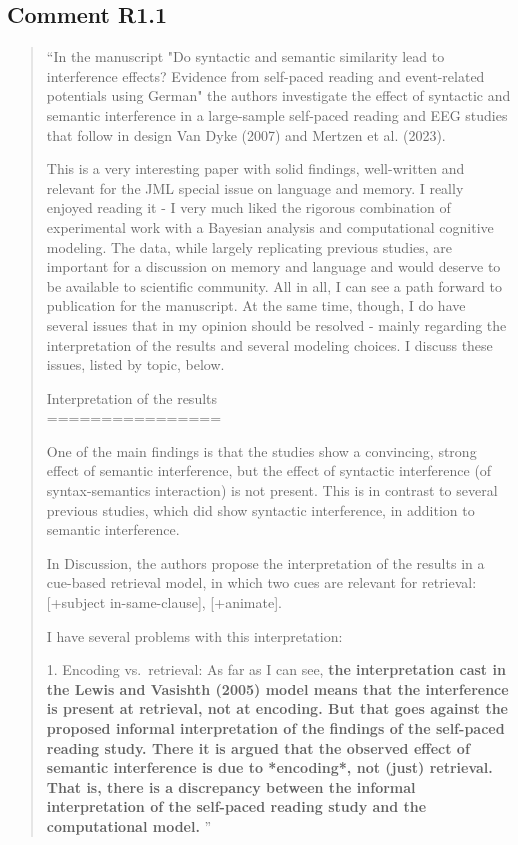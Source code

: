 \documentclass[12pt]{article}
\begin{document}
\subsection*{Comment R1.1}
\begin{quote}
``In the manuscript "Do syntactic and semantic similarity lead to interference effects? Evidence from self-paced reading and event-related potentials using German" the authors investigate the effect of syntactic and semantic interference in a large-sample self-paced reading and EEG studies that follow in design Van Dyke (2007) and Mertzen et al. (2023).

This is a very interesting paper with solid findings, well-written and relevant for the JML special issue on language and memory. I really enjoyed reading it - I very much liked the rigorous combination of experimental work with a Bayesian analysis and computational cognitive modeling. The data, while largely replicating previous studies, are important for a discussion on memory and language and would deserve to be available to scientific community. All in all, I can see a path forward to publication for the manuscript. At the same time, though, I do have several issues that in my opinion should be resolved - mainly regarding the interpretation of the results and several modeling choices. I discuss these issues, listed by topic, below.

Interpretation of the results\\
================

One of the main findings is that the studies show a convincing, strong effect of semantic interference, but the effect of syntactic interference (of syntax-semantics interaction) is not present. This is in contrast to several previous studies, which did show syntactic interference, in addition to semantic interference.

In Discussion, the authors propose the interpretation of the results in a cue-based retrieval model, in which two cues are relevant for retrieval: [+subject in-same-clause], [+animate].

I have several problems with this interpretation:

1. Encoding vs.\ retrieval: As far as I can see, \textbf{the interpretation cast in the Lewis and Vasishth (2005) model means that the interference is present at retrieval, not at encoding. But that goes against the proposed informal interpretation of the findings of the self-paced reading study. There it is argued that the observed effect of semantic interference is due to *encoding*, not (just) retrieval. That is, there is a discrepancy between the informal interpretation of the self-paced reading study and the computational model.} ''\end{quote}
\end{document}
